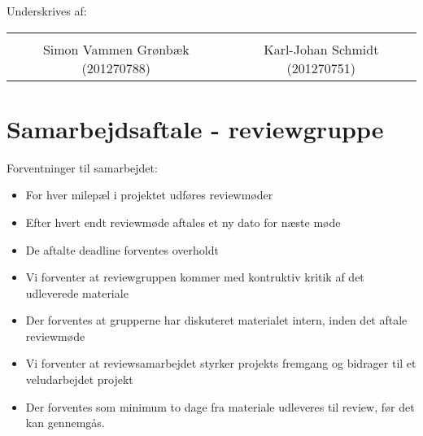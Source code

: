 \hspace{3cm}

Underskrives af: 




\begin{table}[H]
	\centering
	\begin{tabular}{c c}
		\underline{\phantom{mmmmmmmmmmmmmmmmmmmmm}} & \underline{\phantom{mmmmmmmmmmmmmmmmmmmmm}} \\
		Simon Vammen Grønbæk (201270788) \vspace{2cm} & Karl-Johan Schmidt (201270751) \vspace{2cm}\\
	\end{tabular}
\end{table}

\newpage
\section{Samarbejdsaftale - reviewgruppe}

Forventninger til samarbejdet:
\begin{itemize}
	\item For hver milepæl i projektet udføres reviewmøder
	\item Efter hvert endt reviewmøde aftales et ny dato for næste møde
	\item De aftalte deadline forventes overholdt
	\item Vi forventer at reviewgruppen kommer med kontruktiv kritik af det udleverede materiale
	\item Der forventes at grupperne har diskuteret materialet intern, inden det aftale reviewmøde
	\item Vi forventer at reviewsamarbejdet styrker projekts fremgang og bidrager til et veludarbejdet projekt
	\item Der forventes som minimum to dage fra materiale udleveres til review, før det kan gennemgås. 
\end{itemize}

\hspace{3cm}

